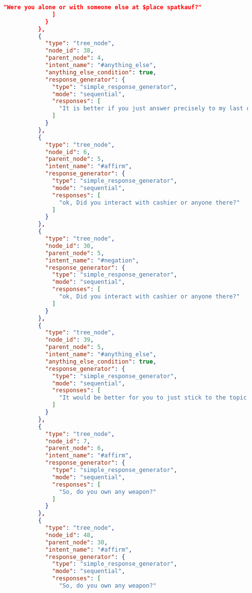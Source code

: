 \begin{appendix}
\begin{lstlisting}[language=json, firstnumber=1]
                "Were you alone or with someone else at $place spatkauf?"
              ]
            }
          },
          {
            "type": "tree_node",
            "node_id": 38,
            "parent_node": 4,
            "intent_name": "#anything_else",
            "anything_else_condition": true,
            "response_generator": {
              "type": "simple_response_generator",
              "mode": "sequential",
              "responses": [
                "It is better if you just answer precisely to my last question and tell me what did you buy from there? "
              ]
            }
          },
          {
            "type": "tree_node",
            "node_id": 6,
            "parent_node": 5,
            "intent_name": "#affirm",
            "response_generator": {
              "type": "simple_response_generator",
              "mode": "sequential",
              "responses": [
                "ok, Did you interact with cashier or anyone there?"
              ]
            }
          },
          {
            "type": "tree_node",
            "node_id": 30,
            "parent_node": 5,
            "intent_name": "#negation",
            "response_generator": {
              "type": "simple_response_generator",
              "mode": "sequential",
              "responses": [
                "ok, Did you interact with cashier or anyone there?"
              ]
            }
          },
          {
            "type": "tree_node",
            "node_id": 39,
            "parent_node": 5,
            "intent_name": "#anything_else",
            "anything_else_condition": true,
            "response_generator": {
              "type": "simple_response_generator",
              "mode": "sequential",
              "responses": [
                "It would be better for you to just stick to the topic and answer my last question."
              ]
            }
          },
          {
            "type": "tree_node",
            "node_id": 7,
            "parent_node": 6,
            "intent_name": "#affirm",
            "response_generator": {
              "type": "simple_response_generator",
              "mode": "sequential",
              "responses": [
                "So, do you own any weapon?"
              ]
            }
          },
          {
            "type": "tree_node",
            "node_id": 48,
            "parent_node": 30,
            "intent_name": "#affirm",
            "response_generator": {
              "type": "simple_response_generator",
              "mode": "sequential",
              "responses": [
                "So, do you own any weapon?"

\end{lstlisting}
\end{appendix}

